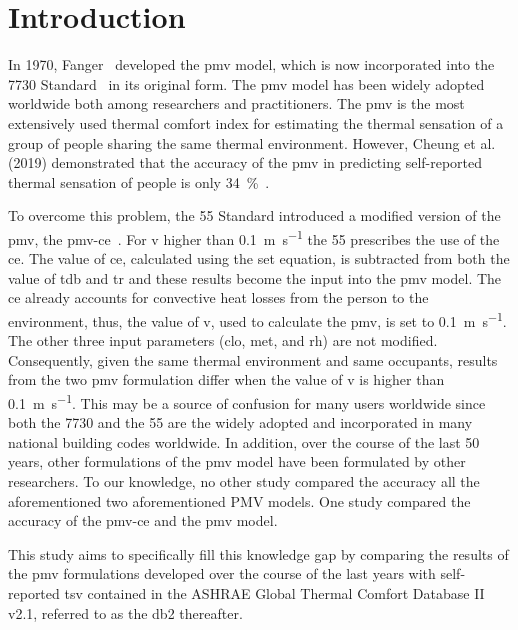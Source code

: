 
\section{Introduction}\label{sec:introduction}

    In 1970, Fanger~\cite{Fanger1970} developed the \ac{pmv} model, which is now incorporated into the \gls{7730} Standard~\cite{iso7730} in its original form.
    The \ac{pmv} model has been widely adopted worldwide both among researchers and practitioners.
    The \ac{pmv} is the most extensively used thermal comfort index for estimating the thermal sensation of a group of people sharing the same thermal environment.
    However, Cheung et al. (2019) demonstrated that the accuracy of the \ac{pmv} in predicting self-reported thermal sensation of people is only \qty{34}{\percent}~\cite{Cheung2019}.

    To overcome this problem, the \gls{55} Standard introduced a modified version of the \ac{pmv}, the \gls{pmv-ce}~\cite{ashrae552020}.
    For \ac{v} higher than \qty{0.1}{\m\per\s} the \gls{55} prescribes the use of the \ac{ce}.
    The value of \ac{ce}, calculated using the \ac{set} equation, is subtracted from both the value of \ac{tdb} and \ac{tr} and these results become the input into the \ac{pmv} model.
    The \ac{ce} already accounts for convective heat losses from the person to the environment, thus, the value of \ac{v}, used to calculate the \ac{pmv}, is set to \qty{0.1}{\m\per\s}.
    The other three input parameters (\ac{clo}, \ac{met}, and \ac{rh}) are not modified.
    Consequently, given the same thermal environment and same occupants, results from the two \ac{pmv} formulation differ when the value of \ac{v} is higher than \qty{0.1}{\m\per\s}.
    This may be a source of confusion for many users worldwide since both the \gls{7730} and the \gls{55} are the widely adopted and incorporated in many national building codes worldwide.
    In addition, over the course of the last \num{50} years, other formulations of the \ac{pmv} model have been formulated by other researchers.
    To our knowledge, no other study compared the accuracy all the aforementioned  two aforementioned PMV models.
    One study compared the accuracy of the \ac{pmv-ce} and the \ac{pmv} model.

    This study aims to specifically fill this knowledge gap by comparing the results of the \ac{pmv} formulations developed over the course of the last years with self-reported \ac{tsv} contained in the ASHRAE Global Thermal Comfort Database II v2.1, referred to as the \gls{db2} thereafter.


